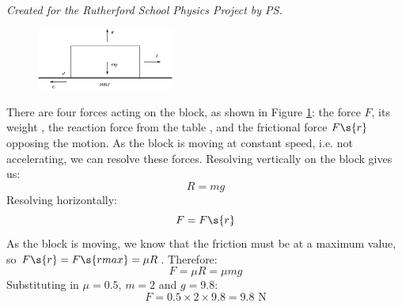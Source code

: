 
\begin{problem}
{}
{\textit{Created for the Rutherford School Physics Project by PS.}}
{
\begin{figure}
	\centering
	\includegraphics[width=0.4\textwidth]{../../../figures/Statics_block_friction.svg}
	\caption{}
	\label{fig:Statics_block_friction}
\end{figure}
There are four forces acting on the block, as shown in Figure \ref{fig:Statics_block_friction}: the force $F$, its weight , the reaction force from the table , and the frictional force $F\s{r}$ opposing the motion. As the block is moving at constant speed, i.e. not accelerating, we can resolve these forces. Resolving vertically on the block gives us:
\begin{equation*}	R = mg	\end{equation*}
Resolving horizontally:
\begin{equation*} F = F\s{r}	\end{equation*}
As the block is moving, we know that the friction must be at a maximum value, so $F\s{r} = F\s{r max} = \mu R$. Therefore:
\begin{equation*} F = \mu R = \mu mg	\end{equation*}
Substituting in $\mu = 0.5$, $m = 2$ and $g = 9.8$:
\begin{equation*}	F = 0.5 \times 2 \times 9.8 = 9.8\textrm{ N}	\end{equation*}
}
\end{problem}